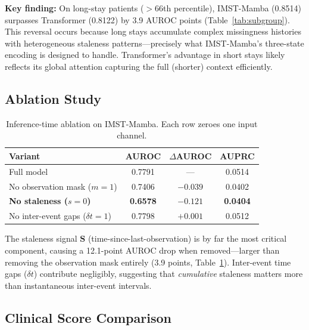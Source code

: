 \documentclass[twoside,11pt]{article}
\begin{document}
\textbf{Key finding:} On long-stay patients ($>$66th percentile),
IMST-Mamba (0.8514) surpasses Transformer (0.8122) by 3.9 AUROC points
(Table~\ref{tab:subgroup}).  This reversal occurs because long stays accumulate
complex missingness histories with heterogeneous staleness patterns—precisely
what IMST-Mamba's three-state encoding is designed to handle.
Transformer's advantage in short stays likely reflects its global attention
capturing the full (shorter) context efficiently.

\subsection{Ablation Study}

\begin{table}[t]
\caption{Inference-time ablation on IMST-Mamba.  Each row zeroes one input
channel.}
\label{tab:ablation}
\centering
\begin{tabular}{lccc}
\toprule
Variant & AUROC & $\Delta$AUROC & AUPRC \\
\midrule
Full model                    & 0.7791 & —        & 0.0514 \\
No observation mask ($m{=}1$) & 0.7406 & $-0.039$ & 0.0402 \\
\textbf{No staleness ($s{=}0$)} & \textbf{0.6578} & $\mathbf{-0.121}$ & \textbf{0.0404} \\
No inter-event gaps ($\delta t{=}1$) & 0.7798 & $+0.001$ & 0.0512 \\
\bottomrule
\end{tabular}
\end{table}

The staleness signal $\mathbf{S}$ (time-since-last-observation) is by far the
most critical component, causing a 12.1-point AUROC drop when removed—larger
than removing the observation mask entirely (3.9 points,
Table~\ref{tab:ablation}).  Inter-event time gaps ($\delta t$) contribute
negligibly, suggesting that \emph{cumulative} staleness matters more than
instantaneous inter-event intervals.

\subsection{Clinical Score Comparison}
\end{document}
